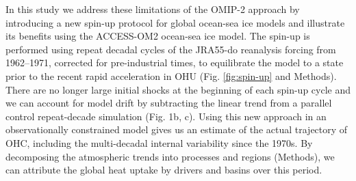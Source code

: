 \documentclass{nature}
\begin{document}
	In this study we address these limitations of the OMIP-2 approach by introducing a new spin-up protocol for global ocean-sea ice models and illustrate its benefits using the ACCESS-OM2 ocean-sea ice model\cite{kiss2020access}. The spin-up is performed using repeat decadal cycles of the JRA55-do reanalysis forcing from 1962--1971, corrected for pre-industrial times, to equilibrate the model to a state prior to the recent rapid acceleration in OHU (Fig. \ref{fig:spin-up} and Methods). There are no longer large initial shocks at the beginning of each spin-up cycle and we can account for model drift by subtracting the linear trend from a parallel control repeat-decade simulation (Fig. 1b, c). Using this new approach in an observationally constrained model gives us an estimate of the actual trajectory of OHC, including the multi-decadal internal variability since the 1970s. By decomposing the atmospheric trends into processes and regions (Methods), we can attribute the global heat uptake by drivers and basins over this period.
	
	
	
\end{document}
